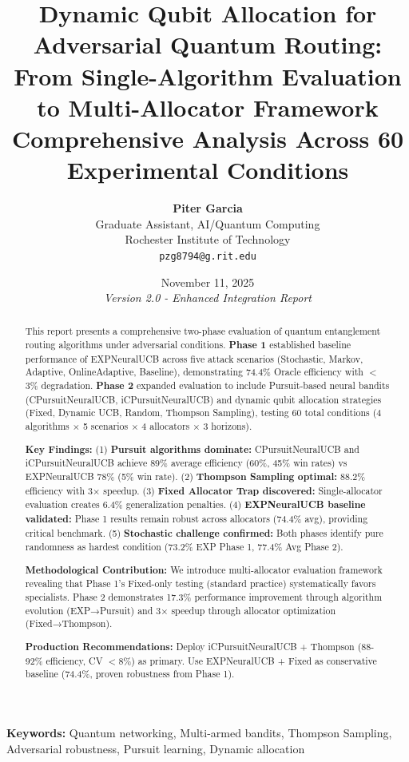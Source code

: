 \documentclass[11pt,a4paper]{article}
\title{\vspace{-1.5cm}\textbf{\LARGE Dynamic Qubit Allocation for Adversarial Quantum Routing:}\\\vspace{0.3cm}\textbf{\Large From Single-Algorithm Evaluation to Multi-Allocator Framework}\\\vspace{0.5cm}\large Comprehensive Analysis Across 60 Experimental Conditions}
\author{\textbf{Piter Garcia}\\Graduate Assistant, AI/Quantum Computing\\Rochester Institute of Technology\\\texttt{pzg8794@g.rit.edu}}
\date{November 11, 2025\\\textit{Version 2.0 - Enhanced Integration Report}}
\begin{document}
\maketitle

\begin{abstract}
This report presents a comprehensive two-phase evaluation of quantum entanglement routing algorithms under adversarial conditions. \textbf{Phase 1} established baseline performance of EXPNeuralUCB across five attack scenarios (Stochastic, Markov, Adaptive, OnlineAdaptive, Baseline), demonstrating 74.4\% Oracle efficiency with $<$3\% degradation. \textbf{Phase 2} expanded evaluation to include Pursuit-based neural bandits (CPursuitNeuralUCB, iCPursuitNeuralUCB) and dynamic qubit allocation strategies (Fixed, Dynamic UCB, Random, Thompson Sampling), testing 60 total conditions (4 algorithms × 5 scenarios × 4 allocators × 3 horizons).

\textbf{Key Findings:} (1) \textbf{Pursuit algorithms dominate:} CPursuitNeuralUCB and iCPursuitNeuralUCB achieve 89\% average efficiency (60\%, 45\% win rates) vs EXPNeuralUCB 78\% (5\% win rate). (2) \textbf{Thompson Sampling optimal:} 88.2\% efficiency with 3× speedup. (3) \textbf{Fixed Allocator Trap discovered:} Single-allocator evaluation creates 6.4\% generalization penalties. (4) \textbf{EXPNeuralUCB baseline validated:} Phase 1 results remain robust across allocators (74.4\% avg), providing critical benchmark. (5) \textbf{Stochastic challenge confirmed:} Both phases identify pure randomness as hardest condition (73.2\% EXP Phase 1, 77.4\% Avg Phase 2).

\textbf{Methodological Contribution:} We introduce multi-allocator evaluation framework revealing that Phase 1's Fixed-only testing (standard practice) systematically favors specialists. Phase 2 demonstrates 17.3\% performance improvement through algorithm evolution (EXP→Pursuit) and 3× speedup through allocator optimization (Fixed→Thompson).

\textbf{Production Recommendations:} Deploy iCPursuitNeuralUCB + Thompson (88-92\% efficiency, CV $<$8\%) as primary. Use EXPNeuralUCB + Fixed as conservative baseline (74.4\%, proven robustness from Phase 1).
\end{abstract}

\noindent\textbf{Keywords:} Quantum networking, Multi-armed bandits, Thompson Sampling, Adversarial robustness, Pursuit learning, Dynamic allocation

\newpage
{\small\tableofcontents}
\newpage
\end{document}
